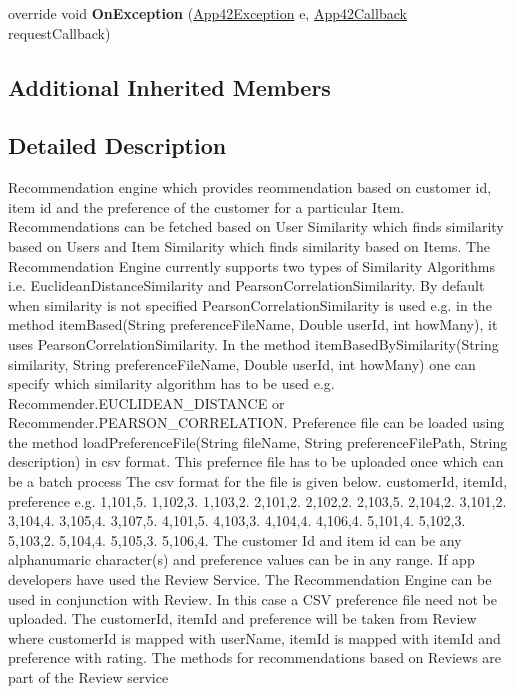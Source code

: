 \begin{DoxyCompactItemize}
\item 
\hypertarget{classcom_1_1shephertz_1_1app42_1_1paas_1_1sdk_1_1windows_1_1recommend_1_1_recommender_service_a9b165b6c162884b868f567fbb73e84d3}{override void {\bfseries On\+Exception} (\hyperlink{classcom_1_1shephertz_1_1app42_1_1paas_1_1sdk_1_1windows_1_1_app42_exception}{App42\+Exception} e, \hyperlink{interfacecom_1_1shephertz_1_1app42_1_1paas_1_1sdk_1_1windows_1_1_app42_callback}{App42\+Callback} request\+Callback)}\label{classcom_1_1shephertz_1_1app42_1_1paas_1_1sdk_1_1windows_1_1recommend_1_1_recommender_service_a9b165b6c162884b868f567fbb73e84d3}

\end{DoxyCompactItemize}
\subsection*{Additional Inherited Members}


\subsection{Detailed Description}
Recommendation engine which provides reommendation based on customer id, item id and the preference of the customer for a particular Item. Recommendations can be fetched based on User Similarity which finds similarity based on Users and Item Similarity which finds similarity based on Items. The Recommendation Engine currently supports two types of Similarity Algorithms i.\+e. Euclidean\+Distance\+Similarity and Pearson\+Correlation\+Similarity. By default when similarity is not specified Pearson\+Correlation\+Similarity is used e.\+g. in the method item\+Based(\+String preference\+File\+Name, Double   user\+Id, int  how\+Many), it uses Pearson\+Correlation\+Similarity. In the method item\+Based\+By\+Similarity(\+String similarity, String preference\+File\+Name, Double   user\+Id, int  how\+Many) one can specify which similarity algorithm has to be used e.\+g. Recommender.\+E\+U\+C\+L\+I\+D\+E\+A\+N\+\_\+\+D\+I\+S\+T\+A\+N\+C\+E or Recommender.\+P\+E\+A\+R\+S\+O\+N\+\_\+\+C\+O\+R\+R\+E\+L\+A\+T\+I\+O\+N. Preference file can be loaded using the method load\+Preference\+File(\+String file\+Name, String preference\+File\+Path, String description) in csv format. This prefernce file has to be uploaded once which can be a batch process The csv format for the file is given below. customer\+Id, item\+Id, preference e.\+g. 1,101,5. 1,102,3. 1,103,2. 2,101,2. 2,102,2. 2,103,5. 2,104,2. 3,101,2. 3,104,4. 3,105,4. 3,107,5. 4,101,5. 4,103,3. 4,104,4. 4,106,4. 5,101,4. 5,102,3. 5,103,2. 5,104,4. 5,105,3. 5,106,4. The customer Id and item id can be any alphanumaric character(s) and preference values can be in any range. If app developers have used the Review Service. The Recommendation Engine can be used in conjunction with Review. In this case a C\+S\+V preference file need not be uploaded. The customer\+Id, item\+Id and preference will be taken from Review where customer\+Id is mapped with user\+Name, item\+Id is mapped with item\+Id and preference with rating. The methods for recommendations based on Reviews are part of the Review service 

